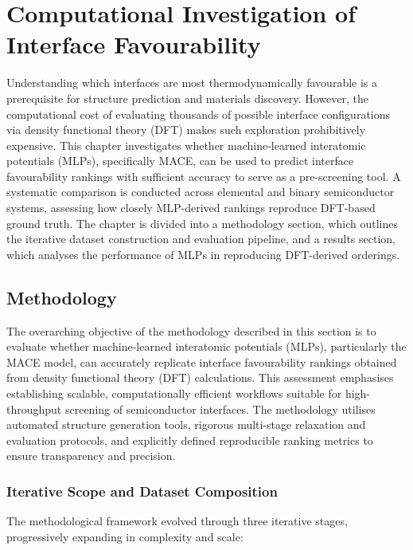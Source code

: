\chapter{Computational Investigation of Interface Favourability} \label{chapter:computational_investigation}

Understanding which interfaces are most thermodynamically favourable is a prerequisite for structure prediction and materials discovery. However, the computational cost of evaluating thousands of possible interface configurations via density functional theory (DFT) makes such exploration prohibitively expensive. This chapter investigates whether machine-learned interatomic potentials (MLPs), specifically MACE, can be used to predict interface favourability rankings with sufficient accuracy to serve as a pre-screening tool. A systematic comparison is conducted across elemental and binary semiconductor systems, assessing how closely MLP-derived rankings reproduce DFT-based ground truth. The chapter is divided into a methodology section, which outlines the iterative dataset construction and evaluation pipeline, and a results section, which analyses the performance of MLPs in reproducing DFT-derived orderings.

\section{Methodology} \label{section:methodology}

The overarching objective of the methodology described in this section is to evaluate whether machine-learned interatomic potentials (MLPs), particularly the MACE model, can accurately replicate interface favourability rankings obtained from density functional theory (DFT) calculations. This assessment emphasises establishing scalable, computationally efficient workflows suitable for high-throughput screening of semiconductor interfaces. The methodology utilises automated structure generation tools, rigorous multi-stage relaxation and evaluation protocols, and explicitly defined reproducible ranking metrics to ensure transparency and precision.

\subsection{Iterative Scope and Dataset Composition}

The methodological framework evolved through three iterative stages, progressively expanding in complexity and scale:

